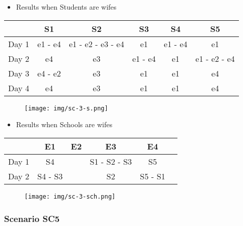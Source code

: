 \documentclass{article}
\begin{document}
\section*{}
\begin{itemize}
    \item Results when Students are wifes
\end{itemize}

\begin{tabular}{|c|c|c|c|c|c|}
    \hline
          & S1      & S2                & S3      & S4      & S5           \\
    \hline
    Day 1 & e1 - e4 & e1 - e2 - e3 - e4 & e1      & e1 - e4 & e1           \\
    \hline
    Day 2 & e4      & e3                & e1 - e4 & e1      & e1 - e2 - e4 \\
    \hline
    Day 3 & e4 - e2 & e3                & e1      & e1      & e4           \\
    \hline
    Day 4 & e4      & e3                & e1      & e1      & e4           \\
    \hline
\end{tabular}

\begin{figure}[h]
    \hspace{0.5cm}
    \texttt{[image: img/sc-3-s.png]}
\end{figure}
\newpage
\begin{itemize}
    \item Results when Schools are wifes
\end{itemize}

\begin{tabular}{|c|c|c|c|c|c|}
    \hline
          & E1      & E2 & E3           & E4      \\
    \hline
    Day 1 & S4      &    & S1 - S2 - S3 & S5      \\
    \hline
    Day 2 & S4 - S3 &    & S2           & S5 - S1 \\
    \hline
\end{tabular}
\begin{figure}[h]
    \hspace{0.5cm}
    \texttt{[image: img/sc-3-sch.png]}
\end{figure}

\subsubsection{Scenario SC5}
\end{document}
